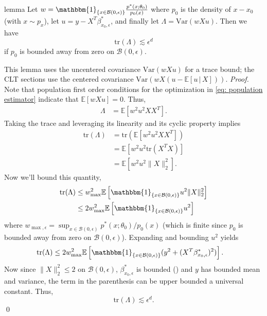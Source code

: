 \documentclass[11pt]{article}
\begin{document}
\begin{restatable}{lemma}{} \label{lemma: Lambda trace bound}
    Let $w = \mathbbm{1}_{\{x \in \mathcal{B}(0, \epsilon)\}}\frac{p^*(x; \theta_0)}{p_0(x)}$ where $p_0$ is the density of $x - x_0$ (with $x \sim p_x$), let $u = y - X^T\beta_{x_0, \epsilon}^*$, and finally let $\Lambda = \text{Var}(wXu)$. Then we have
    \[\text{tr}\left(\Lambda\right) \lesssim \epsilon^{d} \]
    if $p_0$ is bounded away from zero on $\mathcal{B}(0, \epsilon)$.
\end{restatable}
This lemma uses the uncentered covariance $\text{Var}(wXu)$ for a trace bound; the CLT sections use the centered covariance $\text{Var}(wX(u - \mathbb{E}[u\,|\,X]))$.
\noindent \textit{Proof.} Note that population first order conditions for the optimization in \cref{eq: population estimator} indicate that $\mathbb{E}[wXu] = 0$. Thus,
\begin{align*}
    \Lambda &= \mathbb{E}\left[w^2u^2XX^T\right].
\end{align*}
Taking the trace and leveraging its linearity and its cyclic property implies
\begin{align*}
    \text{tr}(\Lambda) &= \text{tr}\left(\mathbb{E}\left[w^2u^2XX^T\right]\right) \\
    &= \mathbb{E}\left[w^2u^2\text{tr}\left(X^TX\right)\right] \\
    &= \mathbb{E}\left[w^2u^2\|X\|_2^2\right]. 
\end{align*}
Now we'll bound this quantity,
\begin{align*}
    \text{tr}(\Lambda) &\leq  w_{\max}^2\mathbb{E}\left[\mathbbm{1}_{\{x \in \mathcal{B}(0, \epsilon)\}}u^2\|X\|_2^2\right] \\
    &\leq 2w_{\max}^2\mathbb{E}\left[\mathbbm{1}_{\{x \in \mathcal{B}(0, \epsilon)\}}u^2\right]
\end{align*}
where $w_{\max, \epsilon} = \sup_{x \in \mathcal{B}(0, \epsilon)}p^*(x; \theta_0)/p_0(x)$ (which is finite since $p_0$ is bounded away from zero on $\mathcal{B}(0, \epsilon)$). Expanding and bounding $u^2$ yields
\begin{align*}
    \text{tr}(\Lambda) &\leq 2w_{\max}^2\mathbb{E}\left[\mathbbm{1}_{\{x \in \mathcal{B}(0, \epsilon)\}}(y^2 + (X^T\beta^*_{x_0, \epsilon})^2)\right]. 
\end{align*}
Now since $\|X\|_2^2 \leq 2$ on $\mathcal{B}(0, \epsilon)$, $\beta^*_{x_0, \epsilon}$ is bounded () and $y$ has bounded mean and variance, the term in the parenthesis can be upper bounded a universal constant. Thus,
\[\text{tr}(\Lambda) \lesssim \epsilon^d.\]
\qed{}
\end{document}
